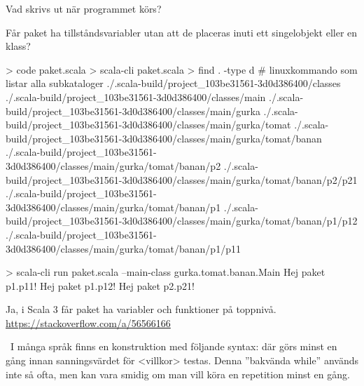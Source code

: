 \Subtask Vad skrivs ut när programmet körs?

\Subtask Får paket ha tillståndsvariabler utan att de placeras inuti ett singelobjekt eller en klass?

\SOLUTION

\TaskSolved \what

\SubtaskSolved

\begin{REPL}
> code paket.scala
> scala-cli paket.scala
> find . -type d         # linuxkommando som listar alla subkataloger
./.scala-build/project_103be31561-3d0d386400/classes
./.scala-build/project_103be31561-3d0d386400/classes/main
./.scala-build/project_103be31561-3d0d386400/classes/main/gurka
./.scala-build/project_103be31561-3d0d386400/classes/main/gurka/tomat
./.scala-build/project_103be31561-3d0d386400/classes/main/gurka/tomat/banan
./.scala-build/project_103be31561-3d0d386400/classes/main/gurka/tomat/banan/p2
./.scala-build/project_103be31561-3d0d386400/classes/main/gurka/tomat/banan/p2/p21
./.scala-build/project_103be31561-3d0d386400/classes/main/gurka/tomat/banan/p1
./.scala-build/project_103be31561-3d0d386400/classes/main/gurka/tomat/banan/p1/p12
./.scala-build/project_103be31561-3d0d386400/classes/main/gurka/tomat/banan/p1/p11
\end{REPL}

\SubtaskSolved
\begin{REPL}
> scala-cli run paket.scala --main-class gurka.tomat.banan.Main
Hej paket p1.p11!
Hej paket p1.p12!
Hej paket p2.p21!
\end{REPL}

\SubtaskSolved Ja, i Scala 3 får paket ha variabler och funktioner på toppnivå. \\
 \url{https://stackoverflow.com/a/56566166}

\QUESTEND





\AdvancedTasks %









\QUESTBEGIN

\Task  \what~I många språk finns en konstruktion med följande syntax:  där  görs minst en gång innan sanningsvärdet för <villkor> testas. Denna ''bakvända while'' används inte så ofta, men kan vara smidig om man vill köra en repetition minst en gång. 

